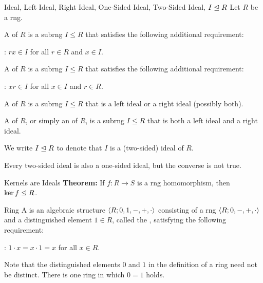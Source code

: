 \documentclass[12pt]{report}
\begin{document}
\begin{dfnbox}{Ideal, Left Ideal, Right Ideal, One-Sided Ideal, Two-Sided Ideal, $I \trianglelefteq R$}
	Let $R$ be a rng.
	\begin{dfnitems}
		\item A  of $R$ is a subrng $I \le R$ that satisfies the following additional requirement:
		\begin{dfnitems}
			\item {}: $rx \in I$ for all $r \in R$ and $x \in I$.
		\end{dfnitems}
		\item A  of $R$ is a subrng $I \le R$ that satisfies the following additional requirement:
		\begin{dfnitems}
			\item {}: $xr \in I$ for all $x \in I$ and $r \in R$.
		\end{dfnitems}
		\item A  of $R$ is a subrng $I \le R$ that is a left ideal or a right ideal (possibly both).
		\item A  of $R$, or simply an  of $R$, is a subrng $I \le R$ that is both a left ideal and a right ideal.
	\end{dfnitems}
	We write $I \trianglelefteq R$ to denote that $I$ is a (two-sided) ideal of $R$.
\end{dfnbox}

Every two-sided ideal is also a one-sided ideal, but the converse is not true.

\begin{thmbox}{Kernels are Ideals}
	\textbf{Theorem:} If $f: R \to S$ is a rng homomorphism, then $\ker f \trianglelefteq R$.
\end{thmbox}

\begin{dfnbox}{Ring}
	A  is an algebraic structure ${\langle {R; 0, 1, -, +, \cdot} \rangle}$ consisting of a rng ${\langle {R; 0, -, +, \cdot} \rangle}$ and a distinguished element $1 \in R$, called the , satisfying the following requirement:
	\begin{dfnitems}
		\item {}: $1 \cdot x = x \cdot 1 = x$ for all $x \in R$.
	\end{dfnitems}
\end{dfnbox}

Note that the distinguished elements $0$ and $1$ in the definition of a ring need not be distinct. There is one ring in which $0 = 1$ holds.
\end{document}
